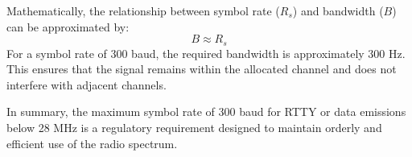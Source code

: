 Mathematically, the relationship between symbol rate (\( R_s \)) and bandwidth (\( B \)) can be approximated by:
\[ B \approx R_s \]
For a symbol rate of 300 baud, the required bandwidth is approximately 300 Hz. This ensures that the signal remains within the allocated channel and does not interfere with adjacent channels.

In summary, the maximum symbol rate of 300 baud for RTTY or data emissions below 28 MHz is a regulatory requirement designed to maintain orderly and efficient use of the radio spectrum.

